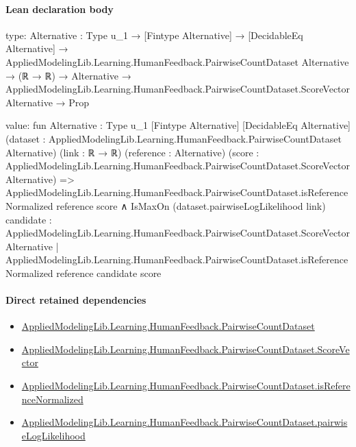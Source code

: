 \documentclass[10pt]{article}
\begin{document}
\paragraph{Lean declaration body}
\begin{ReviewVerbatim}
type:
{Alternative : Type u_1} →
  [Fintype Alternative] →
    [DecidableEq Alternative] →
      AppliedModelingLib.Learning.HumanFeedback.PairwiseCountDataset Alternative →
        (ℝ → ℝ) →
          Alternative → AppliedModelingLib.Learning.HumanFeedback.PairwiseCountDataset.ScoreVector Alternative → Prop

value:
fun {Alternative : Type u_1} [Fintype Alternative] [DecidableEq Alternative]
    (dataset : AppliedModelingLib.Learning.HumanFeedback.PairwiseCountDataset Alternative) (link : ℝ → ℝ)
    (reference : Alternative)
    (score : AppliedModelingLib.Learning.HumanFeedback.PairwiseCountDataset.ScoreVector Alternative) =>
  AppliedModelingLib.Learning.HumanFeedback.PairwiseCountDataset.isReferenceNormalized reference score ∧
    IsMaxOn (dataset.pairwiseLogLikelihood link)
      {candidate : AppliedModelingLib.Learning.HumanFeedback.PairwiseCountDataset.ScoreVector Alternative |
        AppliedModelingLib.Learning.HumanFeedback.PairwiseCountDataset.isReferenceNormalized reference candidate}
      score
\end{ReviewVerbatim}

\paragraph{Direct retained dependencies}
\begin{itemize}\raggedright
\item \hyperlink{governing-declaration-2ba23f394a8d08a2}{Applied\allowbreak{}Modeling\allowbreak{}Lib.\allowbreak{}Learning.\allowbreak{}Human\allowbreak{}Feedback.\allowbreak{}Pairwise\allowbreak{}Count\allowbreak{}Dataset}
\item \hyperlink{governing-declaration-87eda978eb1b0c9d}{Applied\allowbreak{}Modeling\allowbreak{}Lib.\allowbreak{}Learning.\allowbreak{}Human\allowbreak{}Feedback.\allowbreak{}Pairwise\allowbreak{}Count\allowbreak{}Dataset.\allowbreak{}Score\allowbreak{}Vector}
\item \hyperlink{governing-declaration-183c779b24cebcca}{Applied\allowbreak{}Modeling\allowbreak{}Lib.\allowbreak{}Learning.\allowbreak{}Human\allowbreak{}Feedback.\allowbreak{}Pairwise\allowbreak{}Count\allowbreak{}Dataset.\allowbreak{}is\allowbreak{}Reference\allowbreak{}Normalized}
\item \hyperlink{governing-declaration-10adb9e7c1ff9f4c}{Applied\allowbreak{}Modeling\allowbreak{}Lib.\allowbreak{}Learning.\allowbreak{}Human\allowbreak{}Feedback.\allowbreak{}Pairwise\allowbreak{}Count\allowbreak{}Dataset.\allowbreak{}pairwise\allowbreak{}Log\allowbreak{}Likelihood}
\end{itemize}
\hypertarget{governing-declaration-46fcdbad89cd0719}{}
\end{document}
